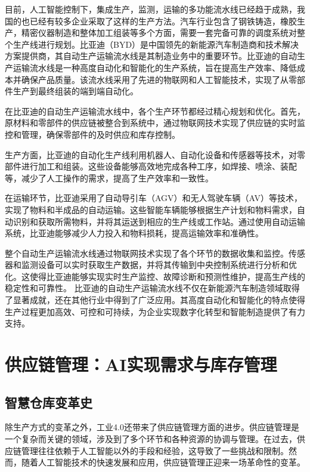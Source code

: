 目前，人工智能控制下，集成生产，监测，运输的多功能流水线已经趋于成熟，我国的也已经有较多企业采取了这样的生产方法。汽车行业包含了钢铁铸造，橡胶生产，精密仪器制造和整体加工组装等多个方面，需要一套完备可靠的调度系统对整个生产线进行规划。比亚迪（BYD）是中国领先的新能源汽车制造商和技术解决方案提供商，其自动生产运输流水线是其制造业务中的重要环节。比亚迪的自动生产运输流水线是一种高度自动化和智能化的生产系统，旨在提高生产效率、降低成本并确保产品质量。该流水线采用了先进的物联网和人工智能技术，实现了从零部件生产到最终组装的端到端自动化。

在比亚迪的自动生产运输流水线中，各个生产环节都经过精心规划和优化。首先，原材料和零部件的供应链被整合到系统中，通过物联网技术实现了供应链的实时监控和管理，确保零部件的及时供应和库存控制。

生产方面，比亚迪的自动化生产线利用机器人、自动化设备和传感器等技术，对零部件进行加工和组装。这些设备能够高效地完成各种工序，如焊接、喷涂、装配等，减少了人工操作的需求，提高了生产效率和一致性。

在运输环节，比亚迪采用了自动导引车（AGV）和无人驾驶车辆（AV）等技术，实现了物料和半成品的自动运输。这些智能车辆能够根据生产计划和物料需求，自动识别和获取所需物料，并将其运送到相应的生产线或工作站。通过使用自动运输系统，比亚迪能够减少人力投入和物料损耗，提高运输效率和准确性。

整个自动生产运输流水线通过物联网技术实现了各个环节的数据收集和监控。传感器和监测设备可以实时获取生产数据，并将其传输到中央控制系统进行分析和优化。这使得比亚迪能够实现实时生产监控、故障诊断和预测性维护，提高生产线的稳定性和可靠性。
比亚迪的自动生产运输流水线不仅在新能源汽车制造领域取得了显著成就，还在其他行业中得到了广泛应用。其高度自动化和智能化的特点使得生产过程更加高效、可控和可持续，为企业实现数字化转型和智能制造提供了有力支持。



\section[供应链管理]{供应链管理：AI实现需求与库存管理}

\subsection{智慧仓库变革史}
除生产方式的变革之外，工业4.0还带来了供应链管理方面的进步。供应链管理是一个复杂而关键的领域，涉及到了多个环节和各种资源的协调与管理。在过去，供应链管理往往依赖于人工智能以外的手段和经验，这导致了一些挑战和限制。然而，随着人工智能技术的快速发展和应用，供应链管理正迎来一场革命性的变革。

